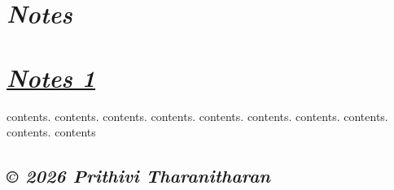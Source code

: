 \documentclass[12pt]{article}
\begin{document}
\section*{\textit{Notes}}

\section*{\href{index.html}{\textit{Notes 1}}}
contents. contents. contents. contents. contents. contents. contents. contents. contents. contents

\subsection*{\textit{© 2026 Prithivi Tharanitharan}}
\end{document}
